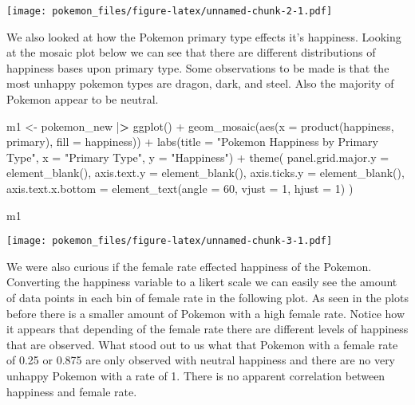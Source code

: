 \documentclass[
]{article}
\newenvironment{Shaded}{\begin{snugshade}}{\end{snugshade}}
\newcommand{\AttributeTok}[1]{\textcolor[rgb]{0.77,0.63,0.00}{#1}}
\newcommand{\DecValTok}[1]{\textcolor[rgb]{0.00,0.00,0.81}{#1}}
\newcommand{\ErrorTok}[1]{\textcolor[rgb]{0.64,0.00,0.00}{\textbf{#1}}}
\newcommand{\FunctionTok}[1]{\textcolor[rgb]{0.00,0.00,0.00}{#1}}
\newcommand{\NormalTok}[1]{#1}
\newcommand{\OtherTok}[1]{\textcolor[rgb]{0.56,0.35,0.01}{#1}}
\newcommand{\SpecialCharTok}[1]{\textcolor[rgb]{0.00,0.00,0.00}{#1}}
\newcommand{\StringTok}[1]{\textcolor[rgb]{0.31,0.60,0.02}{#1}}
\begin{document}
\texttt{[image: pokemon\_files/figure-latex/unnamed-chunk-2-1.pdf]}

We also looked at how the Pokemon primary type effects it's happiness.
Looking at the mosaic plot below we can see that there are different
distributions of happiness bases upon primary type. Some observations to
be made is that the most unhappy pokemon types are dragon, dark, and
steel. Also the majority of Pokemon appear to be neutral.

\begin{Shaded}
\begin{Highlighting}[]
\NormalTok{m1 }\OtherTok{\textless{}{-}}\NormalTok{ pokemon\_new }\SpecialCharTok{|}\ErrorTok{\textgreater{}} \FunctionTok{ggplot}\NormalTok{() }\SpecialCharTok{+}
  \FunctionTok{geom\_mosaic}\NormalTok{(}\FunctionTok{aes}\NormalTok{(}\AttributeTok{x =} \FunctionTok{product}\NormalTok{(happiness, primary), }\AttributeTok{fill =}\NormalTok{ happiness)) }\SpecialCharTok{+} 
  \FunctionTok{labs}\NormalTok{(}\AttributeTok{title =} \StringTok{"Pokemon Happiness by Primary Type"}\NormalTok{, }\AttributeTok{x =} \StringTok{"Primary Type"}\NormalTok{, }
       \AttributeTok{y =} \StringTok{"Happiness"}\NormalTok{) }\SpecialCharTok{+}
  \FunctionTok{theme}\NormalTok{(}
    \AttributeTok{panel.grid.major.y =} \FunctionTok{element\_blank}\NormalTok{(),}
    \AttributeTok{axis.text.y =} \FunctionTok{element\_blank}\NormalTok{(),}
    \AttributeTok{axis.ticks.y =} \FunctionTok{element\_blank}\NormalTok{(),}
    \AttributeTok{axis.text.x.bottom =} \FunctionTok{element\_text}\NormalTok{(}\AttributeTok{angle =} \DecValTok{60}\NormalTok{, }\AttributeTok{vjust =} \DecValTok{1}\NormalTok{, }\AttributeTok{hjust =} \DecValTok{1}\NormalTok{)}
\NormalTok{  )}

\NormalTok{m1}
\end{Highlighting}
\end{Shaded}

\texttt{[image: pokemon\_files/figure-latex/unnamed-chunk-3-1.pdf]}

We were also curious if the female rate effected happiness of the
Pokemon. Converting the happiness variable to a likert scale we can
easily see the amount of data points in each bin of female rate in the
following plot. As seen in the plots before there is a smaller amount of
Pokemon with a high female rate. Notice how it appears that depending of
the female rate there are different levels of happiness that are
observed. What stood out to us what that Pokemon with a female rate of
0.25 or 0.875 are only observed with neutral happiness and there are no
very unhappy Pokemon with a rate of 1. There is no apparent correlation
between happiness and female rate.
\end{document}
